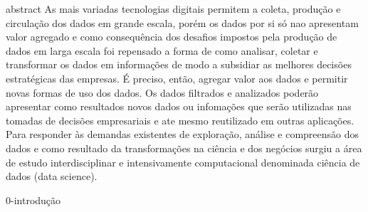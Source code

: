 abstract
As mais variadas tecnologias digitais permitem a  coleta, produção e circulação dos dados em grande escala, porém os dados por si só nao apresentam valor agregado e como consequência dos desafios impostos  pela produção de dados em larga escala foi repensado a forma de como analisar, coletar e transformar os dados em informações de modo a subsidiar as melhores decisões estratégicas das empresas.  É preciso, então, agregar valor aos dados e permitir novas formas de uso dos dados. Os dados filtrados e analizados poderão apresentar como resultados novos dados ou infomações que serão utilizadas nas tomadas de decisões empresariais e ate mesmo reutilizado em outras aplicações. Para responder às demandas existentes de exploração, análise e compreensão dos dados e  como resultado da transformações na ciência e dos  negócios surgiu a área de estudo interdisciplinar e intensivamente computacional denominada ciência de dados (data science).


0-introdução

